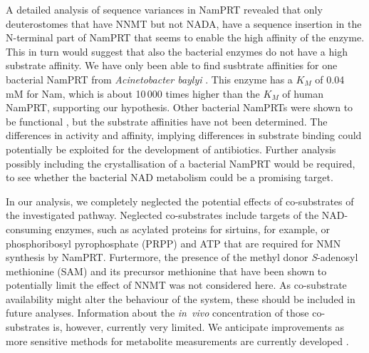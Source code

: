 A detailed analysis of sequence variances in NamPRT revealed that only deuterostomes that have NNMT but not NADA, have a sequence insertion in the N-terminal part of NamPRT that seems to enable the high affinity of the enzyme. This in turn would suggest that also the bacterial enzymes do not have a high substrate affinity. We have only been able to find susbtrate affinities for one bacterial NamPRT from \textit{Acinetobacter baylyi} \cite{Sorci2010}. This enzyme has a $K_{M}$ of 0.04 mM for Nam, which  is about 10\,000 times higher than the $K_{M}$ of human NamPRT, supporting our hypothesis. Other bacterial NamPRTs were shown to be functional \cite{Martin2001,Gerdes2006}, but the substrate affinities have not been determined. The differences in activity and affinity, implying differences in substrate binding could potentially be exploited for the development of antibiotics. Further analysis possibly including the crystallisation of a bacterial NamPRT would be required, to see whether the bacterial NAD metabolism could be a promising target.


In our analysis, we completely neglected the potential effects of co-substrates of the investigated pathway. Neglected co-substrates include targets of the NAD-consuming enzymes, such as acylated proteins for sirtuins, for example, or phosphoribosyl pyrophosphate (PRPP) and ATP that are required for NMN synthesis by NamPRT. Furtermore, the presence of the methyl donor \textit{S}-adenosyl methionine (SAM) and its precursor methionine that have been shown to potentially limit the effect of NNMT \cite{Ulanovskaya2013} was not considered here. As co-substrate availability might alter the behaviour of the system, these should be included in future analyses. Information about the \textit{in~vivo} concentration of those co-substrates is, however, currently very limited. We anticipate improvements as more sensitive methods for metabolite measurements are currently developed .


